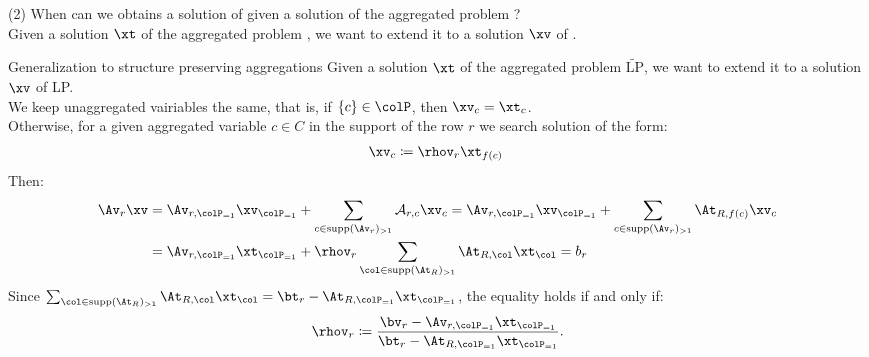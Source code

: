 \begin{frame}{(2) When can we obtains a solution of \CEPT given a solution of the aggregated problem \CEPP? \\ \vspace{1cm}}
    Given a solution \(\xt\) of the aggregated problem \CEPP, we want to extend it to a solution \(\xv\) of \CEPT. \\
\end{frame}
\begin{frame}{Generalization to structure preserving aggregations}
Given a solution \(\xt\) of the aggregated problem \(\tilde{\text{LP}}\), we want to extend it to a solution \(\xv\) of LP. \\
We keep unaggregated vairiables the same, that is, if \(\{c\} \in \colP\), then \(\xv_c = \xt_c\). \\ 
Otherwise, for a given aggregated variable \(c \in C\) in the support of the row \(r\) we search solution of the form: 
\begin{align}
\xv_c \coloneqq \rhov_r \xt_{f(c)} \; 
\end{align}
Then:
    \begin{align}
        \Av_r \xv &=\Av_{r, \colP_{=1}} \xv_{\colP_{=1}} + \sum_{c \in \supp(\Av_r)_{>1}} \A_{r, c} \xv_{c} = \Av_{r, \colP_{=1}} \xv_{\colP_{=1}} + \sum_{c \in \supp(\Av_r)_{>1}} \At_{R, f(c)} \xv_{c}  \\
         &=  \Av_{r, \colP_{=1}} \xt_{\colP_{=1}} + \rhov_r \sum_{\col \in \supp(\At_R)_{>1}} \At_{R, \col}  \xt_{\col} = b_r
    \end{align}
    Since \(\sum_{\col \in \supp(\At_R)_{>1}} \At_{R, \col}  \xt_{\col} = \bt_r
    - \At_{R, \colP_{=1}} \xt_{\colP_{=1}}\), the equality holds if and only if:
    \begin{align}
        \rhov_r \coloneqq \frac{\bv_r - \Av_{r, \colP_{=1}} \xt_{\colP_{=1}}}{\bt_r
            - \At_{R, \colP_{=1}} \xt_{\colP_{=1}}}.
    \end{align}
\end{frame}

